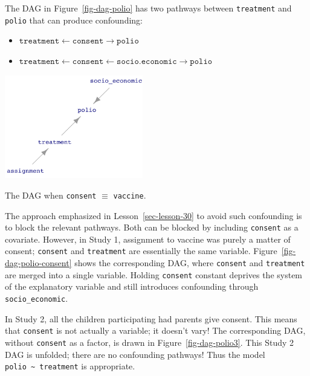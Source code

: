 \documentclass[
  letterpaper,
  DIV=11,
  numbers=noendperiod,
  oneside]{scrreprt}
\providecommand{\tightlist}{%
  \setlength{\itemsep}{0pt}\setlength{\parskip}{0pt}}\usepackage{longtable,booktabs,array}
\begin{document}
{\begin{footnotesize}
The DAG in Figure~\ref{fig-dag-polio} has two pathways between
\texttt{treatment} and \texttt{polio} that can produce confounding:

\begin{itemize}
\tightlist
\item
  \(\mathtt{treatment} \leftarrow \mathtt{consent} \rightarrow \mathtt{polio}\)
\item
  \(\mathtt{treatment} \leftarrow \mathtt{consent} \leftarrow \mathtt{socio.economic} \rightarrow \mathtt{polio}\)
\end{itemize}

\begin{marginfigure}

{\centering \includegraphics[width=2.37in,height=\textheight]{./www/DAG-consent2.png}

}

\caption{\label{fig-dag-polio-consent}The DAG when \texttt{consent}
\(\equiv\) \texttt{vaccine}.}

\end{marginfigure}

The approach emphasized in Lesson~\ref{sec-lesson-30} to avoid such
confounding is to block the relevant pathways. Both can be blocked by
including \texttt{consent} as a covariate. However, in Study 1,
assignment to vaccine was purely a matter of consent; \texttt{consent}
and \texttt{treatment} are essentially the same variable.
Figure~\ref{fig-dag-polio-consent} shows the corresponding DAG, where
\texttt{consent} and \texttt{treatment} are merged into a single
variable. Holding \texttt{consent} constant deprives the system of the
explanatory variable and still introduces confounding through
\texttt{socio\_economic}.

In Study 2, all the children participating had parents give consent.
This means that \texttt{consent} is not actually a variable; it doesn't
vary! The corresponding DAG, without \texttt{consent} as a factor, is
drawn in Figure~\ref{fig-dag-polio3}. This Study 2 DAG is unfolded;
there are no confounding pathways! Thus the model
\texttt{polio\ \textasciitilde{}\ treatment} is appropriate.


\end{footnotesize}}
\end{document}
